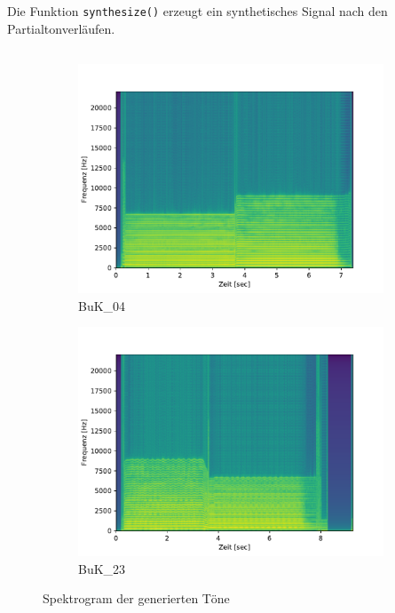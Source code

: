 \subsection{}
Die Funktion \texttt{synthesize()} erzeugt ein synthetisches Signal nach den Partialtonverläufen.


\subsection{}

\begin{figure}[H]
    \centering
    \begin{subfigure}{.5\textwidth}
        \centering
        \caption{BuK\_04}
        \includegraphics[width=\linewidth]{Figures/buk04_spectrogram}
    \end{subfigure}%
    \begin{subfigure}{.5\textwidth}
        \centering
        \caption{BuK\_23}
        \includegraphics[width=\linewidth]{Figures/buk23_spectrogram}
    \end{subfigure}
    \caption{Spektrogram der generierten Töne}
    \label{fig:spectrogram}
\end{figure}

